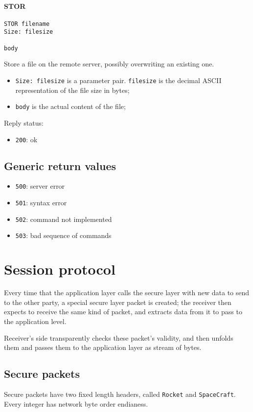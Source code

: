 \documentclass[a4paper,12pt]{article}
\begin{document}
\paragraph{STOR}
\begin{verbatim}
STOR filename
Size: filesize

body
\end{verbatim}

Store a file on the remote server, possibly overwriting an existing one.

\begin{itemize}
  \item \texttt{Size: filesize} is a parameter pair. \texttt{filesize} is the decimal ASCII representation of the file size in bytes;
  \item \texttt{body} is the actual content of the file;
\end{itemize}

Reply status:
\begin{itemize}
  \item \texttt{200}: ok
\end{itemize}

\subsection{Generic return values}
\begin{itemize}
  \item \texttt{500}: server error
  \item \texttt{501}: syntax error
  \item \texttt{502}: command not implemented
  \item \texttt{503}: bad sequence of commands
\end{itemize}

\section{Session protocol}
Every time that the application layer calls the secure layer with new data to send to the other party, a special secure layer packet is created; the receiver then expects to receive the same kind of packet, and extracts data from it to pass to the application level.

Receiver's side transparently checks these packet's validity, and then unfolds them and passes them to the application layer as stream of bytes.

\subsection{Secure packets}
Secure packets have two fixed length headers, called \texttt{Rocket} and \texttt{SpaceCraft}.
Every integer has network byte order endianess.
\end{document}
